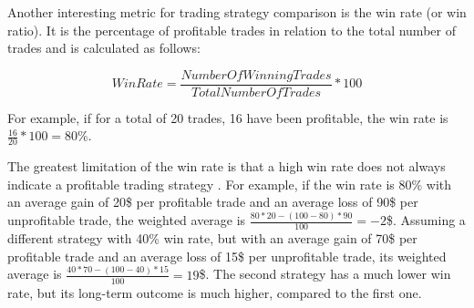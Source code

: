 Another interesting metric for trading strategy comparison is the win rate (or win ratio).
It is the percentage of profitable trades in relation to the total number of trades and is calculated as follows:

\[
    WinRate = \frac{Number Of Winning Trades}{Total Number Of Trades} * 100
\]

\noindent
For example, if for a total of 20 trades, 16 have been profitable, the win rate is $\frac{16}{20} * 100 = 80\%$.

The greatest limitation of the win rate is that a high win rate does not always indicate a profitable trading strategy \cite{win-rate}.
For example, if the win rate is 80\% with an average gain of 20\$ per profitable trade and an average loss of 90\$ per unprofitable trade, the weighted average is $\frac{80 * 20 - (100 - 80) * 90}{100} = -2$\$.
Assuming a different strategy with 40\% win rate, but with an average gain of 70\$ per profitable trade and an average loss of 15\$ per unprofitable trade, its weighted average is $\frac{40 * 70 - (100 - 40) * 15}{100} = 19$\$.
The second strategy has a much lower win rate, but its long-term outcome is much higher, compared to the first one.
